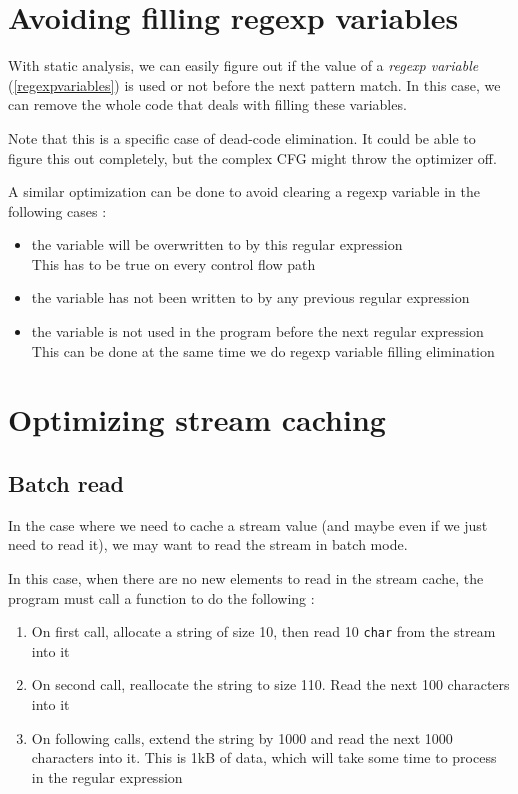 \documentclass[11pt,a4paper]{report}
\newcommand{\ccode}[1]{\texttt{#1}}
\begin{document}
\section{Avoiding filling regexp variables}
\label{regexpvariablesoptimization}

With static analysis, we can easily figure out if the value of a \textit{regexp variable} (\ref{regexpvariables}) is used or not before the next pattern match. In this case, we can remove the whole code that deals with filling these variables.

Note that this is a specific case of dead-code elimination. It could be able to figure this out completely, but the complex CFG might throw the optimizer off.

A similar optimization can be done to avoid clearing a regexp variable in the following cases :
\begin{itemize}
\item the variable will be overwritten to by this regular expression\\
This has to be true on every control flow path
\item the variable has not been written to by any previous regular expression
\item the variable is not used in the program before the next regular expression\\
This can be done at the same time we do regexp variable filling elimination
\end{itemize}

\section{Optimizing stream caching}
\label{streamcachingopt}

\subsection{Batch read}

In the case where we need to cache a stream value (and maybe even if we just need to read it), we may want to read the stream in batch mode.

In this case, when there are no new elements to read in the stream cache, the program must call a function to do the following :
\begin{enumerate}
\item On first call, allocate a string of size 10, then read 10 \ccode{char} from the stream into it
\item On second call, reallocate the string to size 110. Read the next 100 characters into it
\item On following calls, extend the string by 1000 and read the next 1000 characters into it. This is 1kB of data, which will take some time to process in the regular expression
\end{enumerate}
\end{document}
